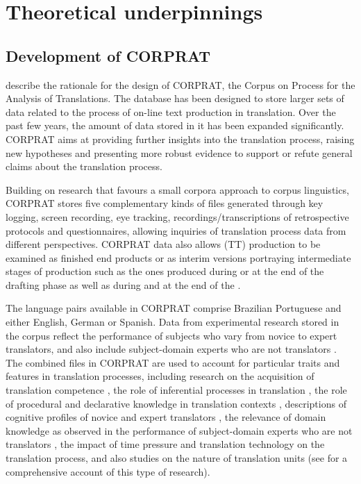 \documentclass[output=paper]{LSP/langsci}
\begin{document}
\section{Theoretical underpinnings}\label{sec:alves:2}
  
\subsection{Development of CORPRAT}

\citet{PaganoEtAl2004} describe the rationale for the design of CORPRAT, the Corpus on Process for the Analysis of Translations. The database has been designed to store larger sets of data related to the process of on-line text production in translation. Over the past few years, the amount of data stored in it has been expanded significantly. CORPRAT aims at providing further insights into the translation process, raising new hypotheses and presenting more robust evidence to support or refute general claims about the translation process. 

\largerpage
Building on research that favours a small corpora approach \citep{GhadessyGao2001} to corpus linguistics, CORPRAT stores five complementary kinds of files generated through key logging, screen recording, eye tracking, recordings/transcriptions of retrospective protocols and questionnaires, allowing inquiries of translation process data from different perspectives. CORPRAT data also allows  (TT) production to be examined as finished end products or as interim versions portraying intermediate stages of  production such as the ones produced during or at the end of the drafting phase as well as during and at the end of the  \citep{Jakobsen2002}. 

The language pairs available in CORPRAT comprise Brazilian Portuguese and either English, German or Spanish. Data from experimental research stored in the corpus reflect the performance of subjects who vary from novice to expert translators, and also include subject-domain experts who are not translators \citep{Pagano2008}. The combined files in CORPRAT are used to account for particular traits and features in translation processes, including research on the acquisition of translation competence \citep{AlvesGoncalves2007}, the role of inferential processes in translation \citep{AlvesGoncalves2003,Alves2007}, the role of procedural and declarative knowledge in translation contexts \citep{Alves2005a}, descriptions of cognitive profiles of novice and expert translators \citep{Alves2005b,Magalhães2006}, the relevance of domain knowledge as observed in the performance of subject-domain experts who are not translators \citep{Pagano2008}, the impact of time pressure \citep{Liparini2005} and translation technology \citep{AlvesLiparini2009} on the translation process, and also studies on the nature of translation units (see \citealt{AlvesVale2009} for a comprehensive account of this type of research).
\end{document}
